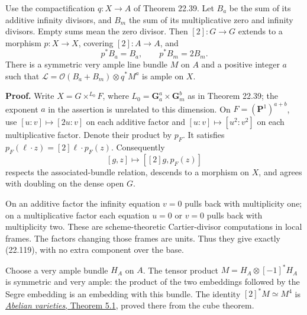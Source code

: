 \documentclass[
  11pt,
  a4paper,
]{article}
\begin{document}
Use the compactification \(q:X\to A\) of Theorem 22.39. Let \(B_a\) be
the sum of its additive infinity divisors, and \(B_m\) the sum of its
multiplicative zero and infinity divisors. Empty sums mean the zero
divisor. Then \([2]:G\to G\) extends to a morphism \(p:X\to X\),
covering \([2]:A\to A\), and \[
 p^*B_a=B_a,\qquad p^*B_m=2B_m.
 \tag{22.119}
\] There is a symmetric very ample line bundle \(M\) on \(A\) and a
positive integer \(a\) such that
\(\mathcal L=\mathcal O(B_a+B_m)\otimes q^*M^a\) is ample on \(X\).

\textbf{Proof.} Write \(X=G\times^{L_0}F\), where
\(L_0=\mathbf G_a^a\times\mathbf G_m^b\) as in Theorem 22.39; the
exponent \(a\) in the assertion is unrelated to this dimension. On
\(F=(\mathbf P^1)^{a+b}\), use \([u:v]\mapsto[2u:v]\) on each additive
factor and \([u:v]\mapsto[u^2:v^2]\) on each multiplicative factor.
Denote their product by \(p_F\). It satisfies
\(p_F(\ell\cdot z)=[2]\ell\cdot p_F(z)\). Consequently \[
 [g,z]\longmapsto[[2]g,p_F(z)]
 \tag{22.120}
\] respects the associated-bundle relation, descends to a morphism on
\(X\), and agrees with doubling on the dense open \(G\).

On an additive factor the infinity equation \(v=0\) pulls back with
multiplicity one; on a multiplicative factor each equation \(u=0\) or
\(v=0\) pulls back with multiplicity two. These are scheme-theoretic
Cartier-divisor computations in local frames. The factors changing those
frames are units. Thus they give exactly (22.119), with no extra
component over the base.

Choose a very ample bundle \(H_A\) on \(A\). The tensor product
\(M=H_A\otimes[-1]^*H_A\) is symmetric and very ample: the product of
the two embeddings followed by the Segre embedding is an embedding with
this bundle. The identity \([2]^*M\simeq M^4\) is
\href{https://github.com/KokunoYumeto/open-math-courses-public/blob/146dc81802e69cf262fb6cc65c1b9f74e71f4625/docs/courses/AG-GS/src/abelian-varieties.md\#5-multiplication-pulls-back-quadratically}{\emph{Abelian
varieties}, Theorem 5.1}, proved there from the cube theorem.
\end{document}
